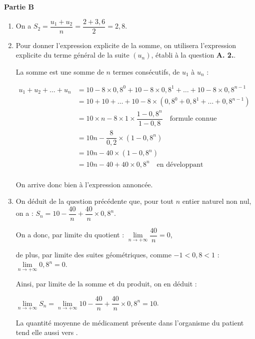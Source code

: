 \medskip

\textbf{Partie B}

\medskip

\begin{enumerate}
	\item On a $S_2 = \dfrac{u_1 + u_2}{n} = \dfrac{2 + 3,6}{2} = 2,8$.

	\item Pour donner l'expression explicite de la somme, on utilisera l'expression explicite du terme général de la suite $(u_n)$, établi à la question \textbf{A. 2.}.

	La somme est une somme de $n$ termes consécutifs, de $u_1$ à $u_n$ :

$\begin{aligned}
		u_1 + u_2 + \dots + u_n
		&= 10 - 8\times 0,8^{0} + 10 - 8\times 0,8^{1} + \dots + 10 - 8\times 0,8^{n-1}\\
		&= 10 + 10 + \dots + 10 - 8\times \left( 0,8^{0} + 0,8^{1} + \dots + 0,8^{n-1}\right)\\
		&= 10\times n - 8 \times 1 \times \dfrac{1 - 0,8^{n}}{1 - 0,8}\quad \text{formule connue}\\
		&= 10 n - \dfrac{8}{0,2} \times \left(1 - 0,8^{n}\right)\\
		&= 10 n - 40 \times \left(1 - 0,8^{n}\right)\\
		&= 10 n - 40 + 40 \times 0,8^{n}\quad \text{en développant}\\
\end{aligned}$

On arrive donc bien à l'expression annoncée.

	\item On déduit de la question précédente que, pour tout $n$ entier naturel non nul, on a : \quad $ S_n = 10 - \dfrac{40}{n} + \dfrac{40}{n}\times 0,8^n $.

On a donc, par limite du quotient : \quad $\lim\limits_{n \to +\infty} \dfrac{40}{n} = 0$,

de plus, par limite des suites géométriques, comme $-1 < 0,8 < 1 $ :\quad $\lim\limits_{n \to +\infty} 0,8^n = 0$.

Ainsi, par limite de la somme et du produit, on en déduit :

$\lim\limits_{n \to +\infty} S_n = \lim\limits_{n \to +\infty} 10 - \dfrac{40}{n} + \dfrac{40}{n}\times 0,8^n  = 10$.

La quantité moyenne de médicament présente dans l'organisme du patient tend elle aussi vers .


\end{enumerate}
